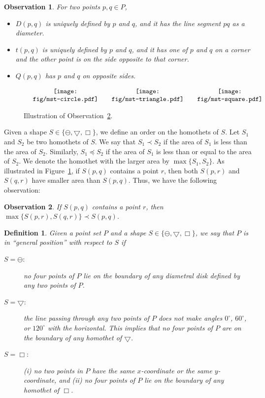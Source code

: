 \documentclass[11pt,a4paper]{article}
\newcommand{\ddisc}{\ominus}
\newcommand{\sqr}{\Box}
\newcommand{\trid}{\bigtriangledown}
\newtheorem{observation}{Observation}
\newtheorem{definition}{Definition}
\begin{document}
\begin{observation}
\label{shrink-triangle-obs}
For two points $p,q\in P$,
\begin{itemize}
 \item $D(p,q)$ is uniquely defined by $p$ and $q$, and it has the line segment $pq$ as a diameter.
\item $t(p, q)$ is uniquely defined by $p$ and $q$, and it has one of $p$ and $q$ on a corner and the other point is
on the side opposite to that corner.
\item $Q(p,q)$ has $p$ and $q$ on opposite sides.
\end{itemize}
\end{observation}

\begin{figure}[htb]
  \centering
\setlength{\tabcolsep}{0in}
  $\begin{tabular}{ccc}
\multicolumn{1}{m{.33\columnwidth}}{\centering\texttt{[image: fig/mst-circle.pdf]}}
&\multicolumn{1}{m{.33\columnwidth}}{\centering\texttt{[image: fig/mst-triangle.pdf]}} &\multicolumn{1}{m{.33\columnwidth}}{\centering\texttt{[image: fig/mst-square.pdf]}}
\end{tabular}$
  \caption{Illustration of Observation~\ref{obs1}.}
\label{mst-in-GS-fig}
\end{figure}
Given a shape $S\in\{\ddisc, \trid, \sqr\}$, we define an order on the homothets of $S$. Let $S_1$ and $S_2$ be two homothets of $S$. We say that $S_1\prec S_2$ if the area of $S_1$ is less than the area of $S_2$. Similarly, $S_1\preceq S_2$ if the area of $S_1$ is less than or equal to the area of $S_2$. We denote the homothet with the larger area by $\max\{S_1, S_2\}$. As illustrated in Figure~\ref{mst-in-GS-fig}, if $S(p,q)$ contains a point $r$, then both $S(p,r)$ and $S(q,r)$ have smaller area than $S(p,q)$. Thus, we have the following observation:
 
\begin{observation}
\label{obs1}
 If $S(p,q)$ contains a point $r$, then $\max\{S(p,r), \allowbreak S(q,r)\}\prec S(p,q)$.
\end{observation}


\begin{definition}
 Given a point set $P$ and a shape $S\in\{\ddisc, \trid, \sqr\}$, we say that $P$ is in ``general position'' with respect to $S$ if
\begin{description}
 \item[$S=\ddisc$:] no four points of $P$ lie on the boundary of any diametral disk defined by any two points of $P$.
 \item[$S=\trid$:] the line passing through any two points of $P$ does not make angles $0^\circ$, $60^\circ$, or $120^\circ$ with the horizontal. This implies that no four points of $P$ are on the boundary of any homothet of $\trid$.
 \item[$S=\sqr$:] (i) no two points in $P$ have the same $x$-coordinate or the same $y$-coordinate, and (ii) no four points of $P$ lie on the boundary of any homothet of $\sqr$.
\end{description}
\end{definition}
\end{document}
